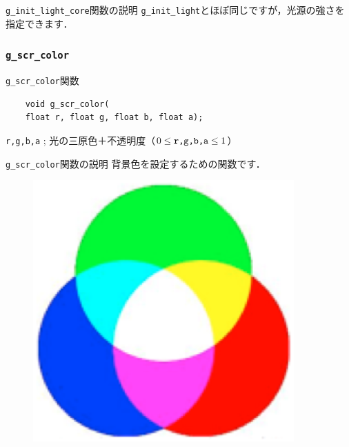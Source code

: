 \documentclass[a4paper,12pt]{jsarticle}%
\begin{document}
\begin{itembox}[l]{\texttt{g\_init\_light\_core}関数の説明}
\texttt{g\_init\_light}とほぼ同じですが，光源の強さを指定できます．
\end{itembox}




\clearpage
\subsubsection{\texttt{g\_scr\_color}}

\begin{itembox}[l]{\texttt{g\_scr\_color}関数}
	\begin{verbatim}
	void g_scr_color(
	float r, float g, float b, float a);
	\end{verbatim}
	\verb|r,g,b,a| ; 光の三原色＋不透明度（$0\leq \verb|r,g,b,a| \leq 1$）\\
\end{itembox}

\begin{itembox}[l]{\texttt{g\_scr\_color}関数の説明}
	背景色を設定するための関数です．
\end{itembox}

\begin{figure}[htb]
	\includegraphics[width=100mm]{./Figures/eps/Canvas_g_scr_color.eps}
\end{figure}
\end{document}
